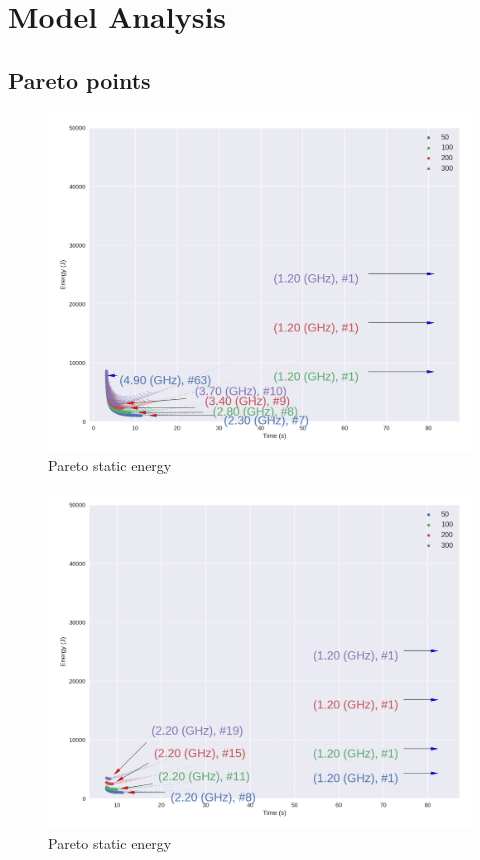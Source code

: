 
\section{Model Analysis}

\subsection{Pareto points}

\begin{figure}
	\centering
	\includegraphics[width=\columnwidth]{models/figures/analisys/pareto_static_high.png}
	\caption{Pareto static energy}
	\label{fig:pareto_static_h}
\end{figure}


\begin{figure}
	\centering
	\includegraphics[width=\columnwidth]{models/figures/analisys/pareto_static_low.png}
	\caption{Pareto static energy}
	\label{fig:pareto_static_l}
\end{figure}


